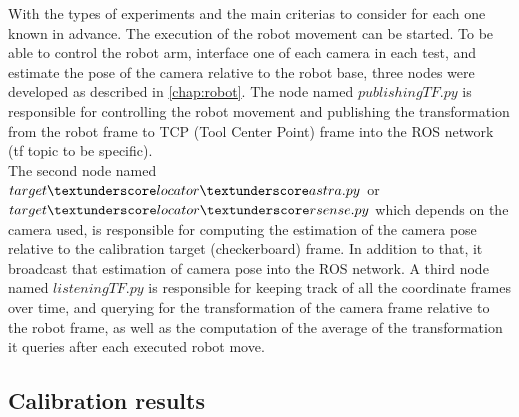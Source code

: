 With the types of experiments and the main criterias to consider for each one known in advance. The execution of the robot movement can be started. To be able to control the robot arm, interface one of each camera in each test, and estimate the pose of the camera relative to the robot base, three nodes were developed as described in \ref{chap:robot}. The node named $publishingTF.py$ is responsible for controlling the robot movement and publishing the transformation from the robot frame to TCP (Tool Center Point) frame into the ROS network (tf topic to be specific). \\
The second node named $target\textunderscore locator \textunderscore astra.py$ or $target\textunderscore locator \textunderscore rsense.py$  which depends on the camera used, is responsible  for computing the estimation of the camera pose relative to the calibration target (checkerboard) frame. In addition to that, it broadcast that estimation of camera pose into the ROS network. A third node named $listeningTF.py$ is responsible for keeping track of all the coordinate frames over time, and querying for the transformation of the camera frame relative to the robot frame, as well as the computation of the average of the transformation it queries after each executed robot move. 

\subsection{Calibration results}

